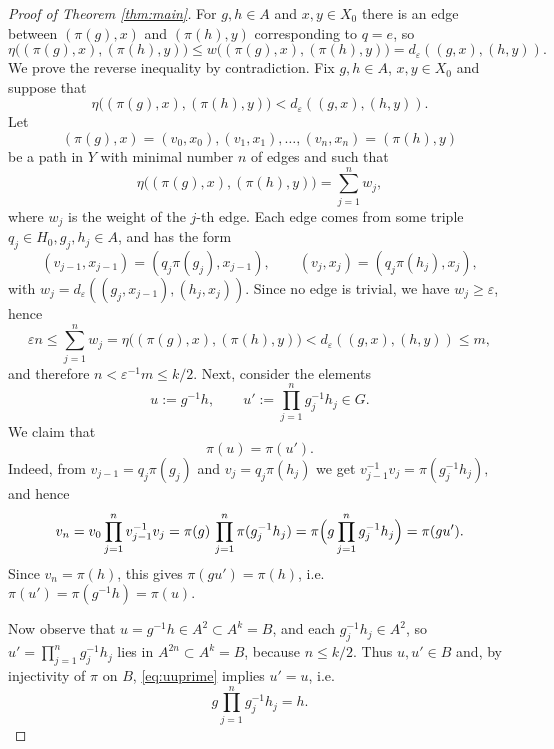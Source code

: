 \documentclass[10pt,a4paper]{amsart}
\begin{document}
\begin{proof}[Proof of Theorem \ref{thm:main}]
For $g,h\in A$ and $x,y\in X_0$ there is an edge between $(\pi(g),x)$ and $(\pi(h),y)$ corresponding to $q=e$, so
\[
\eta\bigl((\pi(g),x),(\pi(h),y)\bigr)
\le w\bigl((\pi(g),x),(\pi(h),y)\bigr)
= d_\varepsilon((g,x),(h,y)).
\]
We prove the reverse inequality by contradiction. Fix $g,h\in A$, $x,y\in X_0$ and suppose that
\begin{equation}\label{eq:contr}
\eta\bigl((\pi(g),x),(\pi(h),y)\bigr)
< d_\varepsilon((g,x),(h,y)).
\end{equation}
Let
\[
(\pi(g),x)=(v_0,x_0), (v_1,x_1),\dots,(v_n,x_n)=(\pi(h),y)
\]
be a path in $Y$ with minimal number $n$ of edges and such that
\[
\eta\bigl((\pi(g),x),(\pi(h),y)\bigr)
= \sum_{j=1}^n w_j,
\]
where $w_j$ is the weight of the $j$-th edge. Each edge comes from some triple $q_j\in H_0,g_j,h_j\in A$,
and has the form
\[
(v_{j-1},x_{j-1})=(q_j\pi(g_j),x_{j-1}),\qquad
(v_j,x_j)=(q_j\pi(h_j),x_j),
\]
with $w_j = d_\varepsilon((g_j,x_{j-1}),(h_j,x_j))$.
Since no edge is trivial, we have $w_j\ge\varepsilon$, hence
\[
\varepsilon n \le \sum_{j=1}^n w_j
= \eta\bigl((\pi(g),x),(\pi(h),y)\bigr)
< d_\varepsilon((g,x),(h,y))
\le m,
\]
and therefore $n < \varepsilon^{-1}m \le k/2$.
Next, consider the elements
\[
u := g^{-1}h,\qquad
u' := \prod_{j=1}^n g_j^{-1}h_j \in G.
\]
We claim that
\begin{equation}\label{eq:uuprime}
\pi(u) = \pi(u').
\end{equation}
Indeed, from $v_{j-1}=q_j\pi(g_j)$ and $v_j=q_j\pi(h_j)$ we get
$v_{j-1}^{-1}v_j = \pi(g_j^{-1}h_j),$
and hence
\[
v_n
= v_0 \prod_{j=1}^n v_{j-1}^{-1}v_j
= \pi(g)\,\prod_{j=1}^n \pi(g_j^{-1}h_j)
= \pi\Bigl(g \prod_{j=1}^n g_j^{-1}h_j\Bigr)
= \pi(gu').
\]
Since $v_n=\pi(h)$, this gives $\pi(gu')=\pi(h)$, i.e.~$\pi(u')=\pi(g^{-1}h)=\pi(u)$.

Now observe that $u = g^{-1}h \in A^2 \subset A^{k}=B$,
and each $g_j^{-1}h_j\in A^2$, so $u'=\prod_{j=1}^n g_j^{-1}h_j$ lies in $A^{2n}\subset A^{k}=B$, because $n\le k/2$. Thus $u,u'\in B$ and, by injectivity of $\pi$ on $B$, \eqref{eq:uuprime} implies $u'=u$, i.e.
\begin{equation}\label{eq:gprod= h}
g\prod_{j=1}^n g_j^{-1}h_j = h.
\end{equation}


\end{proof}
\end{document}
